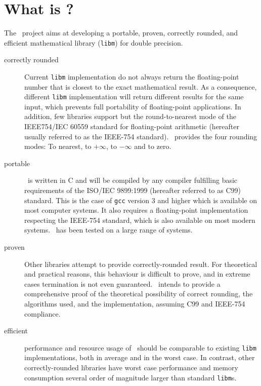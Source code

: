 \section{What is \crlibm?}

The \crlibm\ project aims at developing a portable, proven, correctly rounded,
and efficient mathematical library (\texttt{libm}) for double precision.

\begin{description}
\item[correctly rounded] Current \texttt{libm} implementation do not
  always return the floating-point number that is closest to the exact
  mathematical result. As a consequence, different \texttt{libm}
  implementation will return different results for the same input,
  which prevents full portability of floating-point applications. In
  addition, few libraries support but the round-to-nearest mode of the
  IEEE754/IEC 60559 standard for floating-point arithmetic (hereafter
  usually referred to as the IEEE-754 standard). \crlibm\ provides the
  four rounding modes: To nearest, to $+\infty$, to $-\infty$ and to
  zero.

\item[portable] \crlibm\ is written in C and will be compiled by any
  compiler fulfilling basic requirements of the ISO/IEC 9899:1999
  (hereafter referred to as C99) standard.  This is the case of
  \texttt{gcc} version 3 and higher which is available on most
  computer systems. It also requires a floating-point implementation
  respecting the IEEE-754 standard, which is also available on
  most modern systems. \crlibm\ has been tested on a large range of
  systems.

\item[proven] Other libraries attempt to provide correctly-rounded
  result. For theoretical and practical reasons, this behaviour is
  difficult to prove, and in extreme cases termination is not even
  guaranteed. \crlibm\ intends to provide a comprehensive proof of the
  theoretical possibility of correct rounding, the algorithms used,
  and the implementation, assuming C99 and IEEE-754 compliance.

\item[efficient] performance and resource usage of \crlibm\ should be
  comparable to existing \texttt{libm} implementations, both in
  average and in the worst case. In contrast, other correctly-rounded
  libraries have worst case performance and memory consumption several
  order of magnitude larger than standard \texttt{libm}s.

\end{description}

